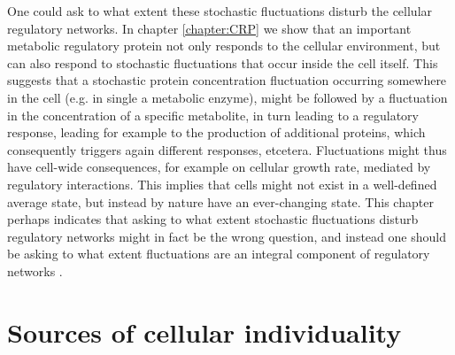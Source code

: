 One could ask to what extent these stochastic fluctuations disturb the cellular regulatory networks.
%
In chapter \ref{chapter:CRP} we show that an important metabolic regulatory protein not only responds to the cellular environment,
but can also respond to stochastic fluctuations that occur inside the cell itself.
%
This suggests that a stochastic protein concentration fluctuation occurring somewhere in the cell (e.g. in single a metabolic enzyme),
might be followed by a fluctuation in the concentration of a specific metabolite, in turn leading to a regulatory response, 
leading for example to the production of additional proteins, which consequently triggers again different responses, etcetera.
%
Fluctuations might thus have cell-wide consequences, for example on cellular growth rate, mediated by regulatory interactions.
%
This implies that cells might not exist in a well-defined average state,
but instead by nature have an ever-changing state.
%
%
%
This chapter perhaps 
indicates that asking to what extent stochastic fluctuations disturb regulatory networks might in fact be the wrong question,
and instead one should be asking to what extent fluctuations are an integral component of regulatory networks \cite{Wollman2018}.

\section{Sources of cellular individuality}

